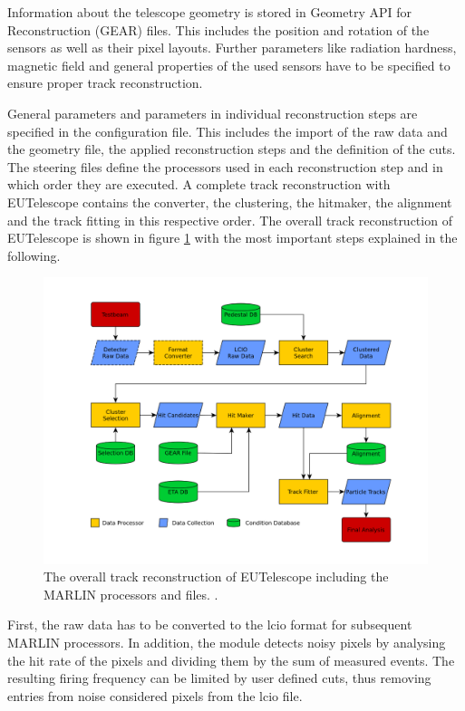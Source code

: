 Information about the telescope geometry is stored in  Geometry API for Reconstruction (GEAR) files. This includes the position and rotation
of the sensors as well as their pixel layouts. Further parameters like radiation hardness, magnetic field and general properties of the used sensors have to be
specified to ensure proper track reconstruction.

General parameters and parameters in individual reconstruction steps are specified in the configuration file. This includes the import of the raw data and the
geometry file, the applied reconstruction steps and the definition of the cuts. \\
The steering files define the processors used in each reconstruction step and in which order they are executed.
A complete track reconstruction with EUTelescope contains the converter, the clustering, the hitmaker, the alignment and the track fitting in this respective order.
The overall track reconstruction of EUTelescope is shown in figure \ref{fig:track_reco} with the most important steps explained in the following.

\begin{figure}
  \centering
  \includegraphics[height=0.6\textwidth]{images/track_reco.png}
  \caption{The overall track reconstruction of EUTelescope including the MARLIN processors and files. \cite{track_reco}.}
  \label{fig:track_reco}
\end{figure}

First, the raw data has to be converted to the lcio format for subsequent MARLIN processors. In addition, the module detects noisy pixels by analysing the
hit rate of the pixels and dividing them by the sum of measured events. The resulting firing frequency can be limited by user defined cuts, thus removing entries
from noise considered pixels from the lcio file.

